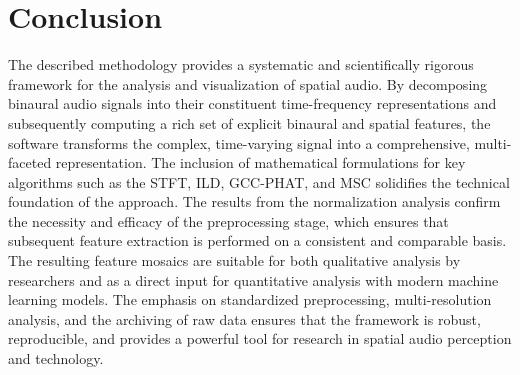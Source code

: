 \documentclass[12pt, a4paper]{article}
\begin{document}
\section{Conclusion}
The described methodology provides a systematic and scientifically rigorous framework for the analysis and visualization of spatial audio. By decomposing binaural audio signals into their constituent time-frequency representations and subsequently computing a rich set of explicit binaural and spatial features, the software transforms the complex, time-varying signal into a comprehensive, multi-faceted representation. The inclusion of mathematical formulations for key algorithms such as the STFT, ILD, GCC-PHAT, and MSC solidifies the technical foundation of the approach. The results from the normalization analysis confirm the necessity and efficacy of the preprocessing stage, which ensures that subsequent feature extraction is performed on a consistent and comparable basis. The resulting feature mosaics are suitable for both qualitative analysis by researchers and as a direct input for quantitative analysis with modern machine learning models. The emphasis on standardized preprocessing, multi-resolution analysis, and the archiving of raw data ensures that the framework is robust, reproducible, and provides a powerful tool for research in spatial audio perception and technology.



\end{document}
